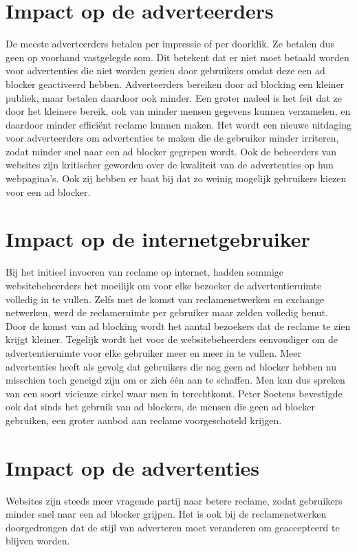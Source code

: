 \documentclass[pdftex,a4paper,12pt,twoside]{report}
\begin{document}
\section{Impact op de adverteerders}
\label{sec:Impact op de adverteerders}
De meeste adverteerders betalen per impressie of per doorklik. Ze betalen dus geen op voorhand vastgelegde som. Dit betekent dat er niet moet betaald worden voor advertenties die niet worden gezien door gebruikers omdat deze een ad blocker geactiveerd hebben. Adverteerders bereiken door ad blocking een kleiner publiek, maar betalen daardoor ook minder. 
Een groter nadeel is het feit dat ze door het kleinere bereik, ook van minder mensen gegevens kunnen verzamelen, en daardoor minder efficiënt reclame kunnen maken.
Het wordt een nieuwe uitdaging voor adverteerders om advertenties te maken die de gebruiker minder irriteren, zodat minder snel naar een ad blocker gegrepen wordt.
Ook de beheerders van websites zijn kritischer geworden over de kwaliteit van de advertenties op hun webpagina’s. Ook zij hebben er baat bij dat zo weinig mogelijk gebruikers kiezen voor een ad blocker.

\section{Impact op de internetgebruiker}
\label{sec:Impact op de internet gebruiker}
Bij het initieel invoeren van reclame op internet, hadden sommige websitebeheerders het moeilijk om voor elke bezoeker de advertentieruimte volledig in te vullen. Zelfs met de komst van reclamenetwerken en exchange netwerken, werd de reclameruimte per gebruiker maar zelden volledig benut. Door de komst van ad blocking wordt het aantal bezoekers dat de reclame te zien krijgt kleiner.  Tegelijk wordt het voor de websitebeheerders eenvoudiger om de advertentieruimte voor elke gebruiker meer en meer in te vullen. Meer advertenties heeft als gevolg dat gebruikers die nog geen ad blocker hebben nu misschien toch geneigd zijn om er zich één aan te schaffen. Men kan dus spreken van een soort vicieuze cirkel waar men in terechtkomt.
Peter Soetens bevestigde ook dat sinds het gebruik van ad blockers, de mensen die geen ad blocker gebruiken, een groter aanbod aan reclame voorgeschoteld krijgen.

\section{Impact op de advertenties}
\label{sec:Impact op de advertenties}
Websites zijn steeds meer vragende partij naar betere reclame, zodat gebruikers minder snel naar een ad blocker grijpen. Het is ook bij de reclamenetwerken doorgedrongen dat de stijl van adverteren moet veranderen om geaccepteerd te blijven worden.
\end{document}
